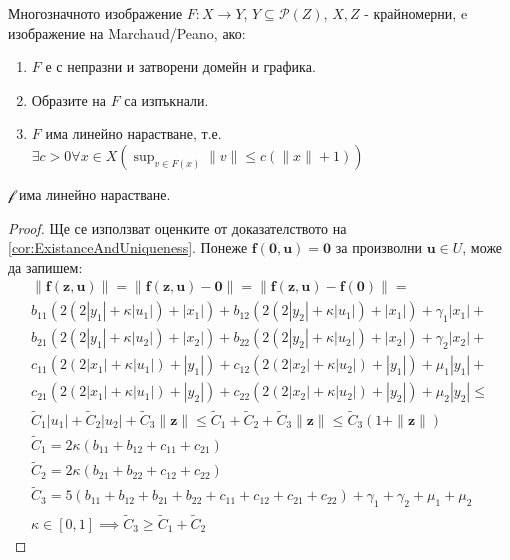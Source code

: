 \begin{definition} \cite[дефиниция~2.2.4, следствие~2.2.5]{Aubin1991}
  \label{def:Marchaud-Peano}
  Многозначното изображение $F:X \rightarrow Y$, $Y \subseteq \mathscr{P}(Z)$, $X, Z$ - крайномерни, e изображение на Marchaud/Peano, ако:
  \begin{enumerate}
    \item $F$ е с непразни и затворени домейн и графика.
    \item Образите на $F$ са изпъкнали.
    \item $F$ има линейно нарастване, т.е. $\exists{c>0}\forall{x \in X}(\sup_{v \in F(x)} \|v\| \leq c(\|x\|+1))$
  \end{enumerate}
\end{definition}

\begin{lemma}
  \label{lm:LinearGrowth}
  $\mathscr{f}$ има линейно нарастване.
\end{lemma}

\begin{proof}
  Ще се използват оценките от доказателството на \eqref{cor:ExistanceAndUniqueness}.
  Понеже $\mathbf{f}(\mathbf{0}, \mathbf{u}) = \mathbf{0}$ за произволни $\mathbf{u} \in U$, може да запишем:
  \begin{multline}
    \|\mathbf{f}(\mathbf{z}, \mathbf{u})\| = \|\mathbf{f}(\mathbf{z}, \mathbf{u}) - \mathbf{0}\| = \|\mathbf{f}(\mathbf{z}, \mathbf{u}) - \mathbf{f}(\mathbf{0})\| = \\
    b_{11} (2 (2 |y_1| + \kappa |u_1|) + |x_1|) + b_{12}(2  (2 |y_2| + \kappa |u_1|) +  |x_1|) + \gamma_1 |x_1| + \\
    b_{21} (2 (2|y_1| + \kappa |u_2|) + |x_2|) + b_{22} (2 (2|y_2| + \kappa |u_2|) + |x_2|) + \gamma_2 |x_2| + \\
    c_{11}(2  (2|x_1| +  \kappa |u_1|) +  |y_1|) + c_{12} (2 (2|x_2| + \kappa |u_2|) + |y_1|) + \mu_1 |y_1| + \\
    c_{21} (2  (2|x_1| + \kappa |u_1|) + |y_2|) + c_{22} (2 (2|x_2| + \kappa |u_2|) + |y_2|) + \mu_2 |y_2| \leq \\
    \tilde{C}_1|u_1| + \tilde{C}_2|u_2| + \tilde{C}_3 \|\mathbf{z}\| \leq \tilde{C}_1 + \tilde{C}_2 + \tilde{C}_3 \|\mathbf{z}\| \leq \tilde{C}_3(1 + \|\mathbf{z}\|) \\
    \tilde{C}_1 = 2 \kappa (b_{11} + b_{12} + c_{11} + c_{21}) \\
    \tilde{C}_2 = 2 \kappa (b_{21} + b_{22} + c_{12} + c_{22}) \\
    \tilde{C}_3 = 5 (b_{11} + b_{12} + b_{21} + b_{22} + c_{11} + c_{12} + c_{21} + c_{22}) + \gamma_1 + \gamma_2 + \mu_1 + \mu_2 \\
    \kappa \in [0, 1] \implies \tilde{C}_3 \geq \tilde{C}_1 + \tilde{C}_2
  \end{multline}
\end{proof}

